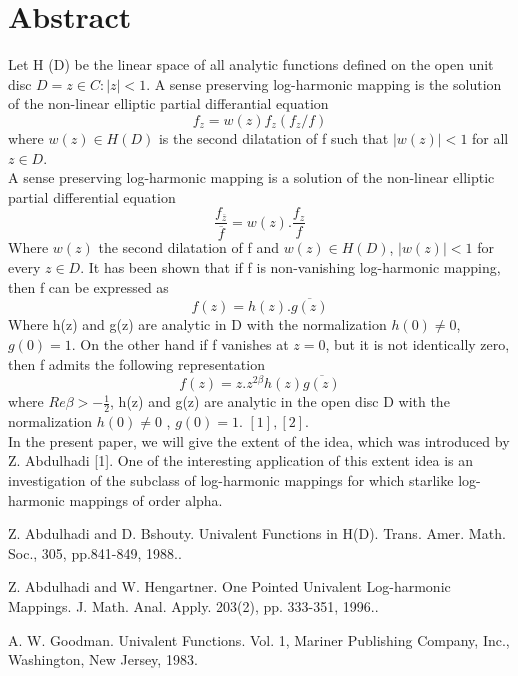 \documentclass[article, A4, 11pt]{llncs}%
\begin{document}
\section*{Abstract}
 Let H (D) be the linear space of all analytic functions defined on the open unit  disc $D ={z \in C : |z| < 1}$. A sense preserving  log-harmonic mapping is the solution of the non-linear  elliptic  partial differantial equation 
$$f_{z}=w(z)f_{z}(f_{z}/f)$$ 
where $w(z)\in H (D)$  is the second dilatation of f  such that $|w(z)|<1$ for all $z\in D$.\\
A  sense preserving log-harmonic mapping  is a solution of the non-linear  elliptic partial differential equation
\begin{equation}
\frac{f_{\overline{z}}}{\overline{f}}=w(z).\frac{f_{z}}{f}
\end{equation}
Where $w(z)$ the second dilatation of  f and  $w(z)\in H(D)$, $|w(z)| <1$ for every $z\in D$. It  has  been shown that  if f is non-vanishing  log-harmonic mapping,  then  f can be expressed as
\begin{equation} f(z)=h(z).\overline{g(z)}
\end{equation}
Where h(z) and  g(z) are analytic  in D  with  the  normalization $h(0)\neq0$, $g(0) = 1$. On the other  hand  if f vanishes at $z=0$, but it is not identically zero, then f admits  the following representation
\begin{equation} f(z)=z.z^{2\beta}h(z)\overline{g(z)}
\end{equation}
where $Re \beta>-\frac{1}{2} $, h(z) and g(z) are analytic  in the open disc D with the normalization $h(0)\neq0$ ,
$g(0) = 1$. $[1], [2]$.\\

In the present paper, we will give the extent of the idea, which was introduced by Z. Abdulhadi [1]. One of the interesting application of this extent idea is an investigation of the subclass of log-harmonic mappings for which starlike log-harmonic mappings of order alpha.



\begin{thebibliography}{10}
{\sc  Z. Abdulhadi and D. Bshouty}. {Univalent Functions in H(D)}. Trans. Amer. Math. Soc., 305, pp.841-849, 1988..

{\sc Z. Abdulhadi and W. Hengartner}. {One Pointed Univalent Log-harmonic Mappings}.  J. Math. Anal. Apply. 203(2), pp. 333-351, 1996..

{\sc A. W. Goodman}. {Univalent Functions}. Vol. 1, Mariner Publishing Company, Inc., Washington, New Jersey, 1983.
\end{thebibliography} %
\end{document}
